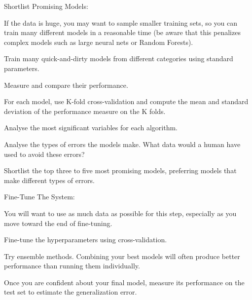 Shortlist Promising Models:
\bit
\item If the data is huge, you may want to sample smaller training sets, so you can train many different models in a
reasonable time (be aware that this penalizes complex models such as large neural nets or Random Forests).
\item Train many quick-and-dirty models from different categories using standard parameters.
\item Measure and compare their performance.
\item For each model, use K-fold cross-validation and compute the mean and standard deviation of the performance measure
on the K folds.
\item Analyse the most significant variables for each algorithm.
\item Analyse the types of errors the models make. What data would a human have used to avoid these errors?
\item Shortlist the top three to five most promising models, preferring models that make different types of errors.
\eit

Fine-Tune The System:
\bit
\item You will want to use as much data as possible for this step, especially as you move toward the end of fine-tuning.
\item Fine-tune the hyperparameters using cross-validation.
\item Try ensemble methods. Combining your best models will often produce better performance than running them
individually.
\item Once you are confident about your final model, measure its performance on the test set to estimate the
generalization error.
\eit